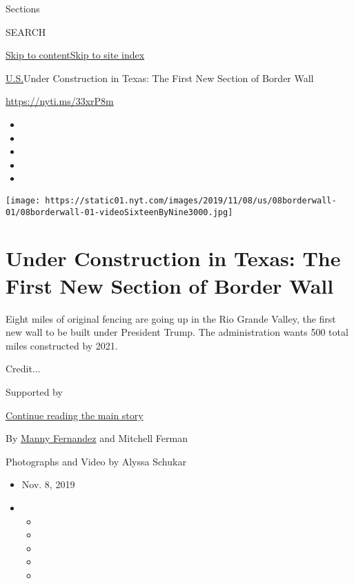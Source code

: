 Sections

SEARCH

\protect\hyperlink{site-content}{Skip to
content}\protect\hyperlink{site-index}{Skip to site index}

\href{/section/us}{U.S.}\textbar{}Under Construction in Texas: The First
New Section of Border Wall

\url{https://nyti.ms/33xrP8m}

\begin{itemize}
\item
\item
\item
\item
\item
\end{itemize}

\texttt{[image: https://static01.nyt.com/images/2019/11/08/us/08borderwall-01/08borderwall-01-videoSixteenByNine3000.jpg]}

\hypertarget{under-construction-in-texas-the-first-new-section-of-border-wall}{%
\section{Under Construction in Texas: The First New Section of Border
Wall}\label{under-construction-in-texas-the-first-new-section-of-border-wall}}

Eight miles of original fencing are going up in the Rio Grande Valley,
the first new wall to be built under President Trump. The administration
wants 500 total miles constructed by 2021.

Credit...

Supported by

\protect\hyperlink{after-sponsor}{Continue reading the main story}

By \href{https://www.nytimes.com/by/manny-fernandez}{Manny Fernandez}
and Mitchell Ferman

Photographs and Video by Alyssa Schukar

\begin{itemize}
\item
  Nov. 8, 2019
\item
  \begin{itemize}
  \item
  \item
  \item
  \item
  \item
  \end{itemize}
\end{itemize}

